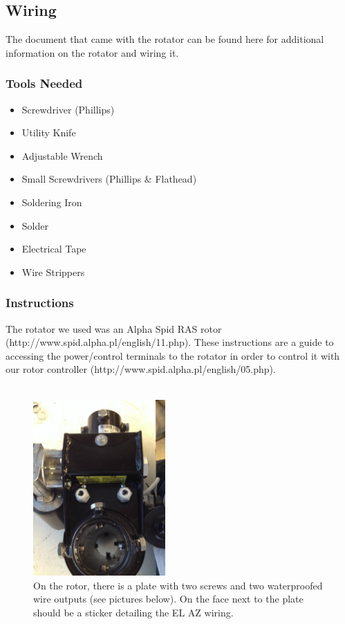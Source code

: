 \documentclass[11pt]{article} %
\begin{document}
\subsection{Wiring}


The document that came with the rotator can be found here for additional information on the rotator and wiring it.

\subsubsection{Tools Needed}
\begin{multicols}{2}
\begin{itemize}
\item Screwdriver (Phillips)
\item Utility Knife
\item Adjustable Wrench
\item Small Screwdrivers (Phillips \& Flathead)
\item Soldering Iron
\item Solder
\item Electrical Tape
\item Wire Strippers
\end{itemize}
\end{multicols}

\subsubsection{Instructions}


The rotator we used was an Alpha Spid RAS rotor (http://www.spid.alpha.pl/english/11.php). These instructions are a guide to accessing the power/control terminals to the rotator in order to control it with our rotor controller (http://www.spid.alpha.pl/english/05.php). \\ \\


\begin{figure}
  \centering
  \caption{On the rotor, there is a plate with two screws and two waterproofed wire outputs (see pictures below). On the face next to the plate should be a sticker detailing the EL AZ wiring. }
  \includegraphics[width=0.45\textwidth]{wiring/01.jpeg}
\end{figure}
\end{document}
